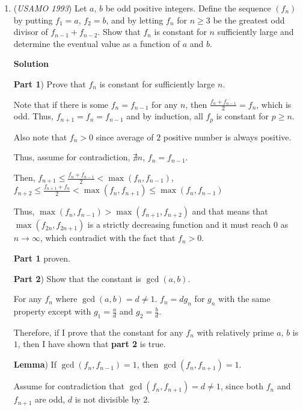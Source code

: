 \begin{enumerate}
 $\mathbb{Q.E.D}$



	\item (\textit{USAMO 1993}) Let $a$, $b$ be odd positive integers. Define the sequence $(f_n)$ by putting $f_1 = a$,
$f_2 = b$, and by letting $f_n$ for $n\ge3$ be the greatest odd divisor of $f_{n-1} + f_{n-2}$.
Show that $f_n$ is constant for $n$ sufficiently large and determine the eventual
value as a function of $a$ and $b$.


 



\textbf{Solution}

\textbf{Part 1}) Prove that $f_n$ is constant for sufficiently large $n$.

 Note that if there is some $f_n=f_{n-1}$ for any $n$, then $\frac{f_{n}+f_{n-1}}{2}=f_n$, which is odd. Thus, $f_{n+1}=f_n=f_{n-1}$ and by induction, all $f_p$ is constant for $p\ge n$.

 Also note that $f_n>0$ since average of $2$ positive number is always positive.

 
Thus, assume for contradiction, $\nexists n$, $f_n=f_{n-1}$.

 Then, $f_{n+1}\le\frac{f_{n}+f_{n-1}}{2}< \max (f_{n},f_{n-1})$, $f_{n+2}\le\frac{f_{n+1}+f_{n}}{2}< \max (f_{n},f_{n+1})\le\max (f_{n},f_{n-1})$

 Thus, $\max (f_{n},f_{n-1})> \max (f_{n+1},f_{n+2})$ and that means that $\max (f_{2n},f_{2n+1})$ is a strictly decreasing function and it must reach $0$ as $n\rightarrow\infty$, which contradict with the fact that $f_n>0$.

 
\textbf{Part 1} proven.

 


 


 \textbf{Part 2}) Show that the constant is $\gcd(a,b)$.

 For any $f_n$ where $\gcd(a,b)=d\ne1$. $f_n=dg_n$ for $g_n$ with the same property except with $g_1=\frac{a}{d}$ and $g_2=\frac{b}{d}$.

 Therefore, if I prove that the constant for any $f_n$ with relatively prime $a$, $b$ is $1$, then I have shown that \textbf{part 2} is true.

 
\textbf{Lemma}) If $\gcd(f_n,f_{n-1})=1$, then $\gcd(f_n,f_{n+1})=1$.

 Assume for contradiction that $\gcd(f_n,f_{n+1})=d\ne1$, since both $f_n$ and $f_{n+1}$ are odd, $d$ is not divisible by $2$.


\end{enumerate}
